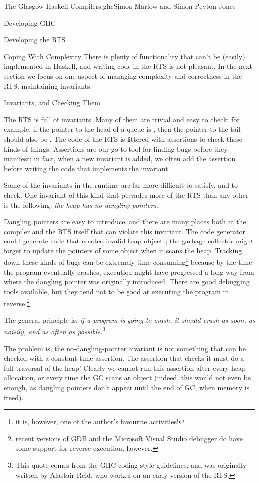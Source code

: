 \begin{aosachapter}{The Glasgow Haskell Compiler}{s:ghc}{Simon Marlow and Simon Peyton-Jones}
\begin{aosasect1}{Developing GHC}
\begin{aosasect2}{Developing the RTS}
\begin{aosasect3}{Coping With Complexity}
There is plenty of functionality that can't be (easily) implemented in
Haskell, and writing code in the RTS is not pleasant.  In the next
section we focus on one aspect of managing complexity and correctness
in the RTS: maintaining invariants.

\end{aosasect3}

\end{aosasect2}

\begin{aosasect2}{Invariants, and Checking Them}

The RTS is full of invariants.  Many of them are trivial and easy to
check: for example, if the pointer to the head of a queue is
, then the pointer to the tail should also be .
The code of the RTS is littered with assertions to check these kinds
of things.  Assertions are our go-to tool for finding bugs before they
manifest; in fact, when a new invariant is added, we often add the
assertion before writing the code that implements the invariant.

Some of the invariants in the runtime are far more difficult to
satisfy, and to check.  One invariant of this kind that pervades more
of the RTS than any other is the following: \emph{the heap has no
  dangling pointers}.

Dangling pointers are easy to introduce, and there are many places
both in the compiler and the RTS itself that can violate this
invariant.  The code generator could generate code that creates
invalid heap objects; the garbage collector might forget to update the
pointers of some object when it scans the heap.  Tracking down these
kinds of bugs can be extremely time consuming\footnote{it is, however,
  one of the author's favourite activities!} because by the time the
program eventually crashes, execution might have progressed a long way
from where the dangling pointer was originally introduced.  There are
good debugging tools available, but they tend not to be good at
executing the program in reverse.\footnote{recent versions of GDB and
  the Microsoft Visual Studio debugger do have some support for
  reverse execution, however.}

The general principle is: \emph{if a program is going to crash, it
  should crash as soon, as noisily, and as often as
  possible.}\footnote{This quote comes from the GHC coding style
  guidelines, and was originally written by Alastair Reid, who worked
  on an early version of the RTS.}

The problem is, the no-dangling-pointer invariant is not something
that can be checked with a constant-time assertion.  The assertion
that checks it must do a full traversal of the heap!  Clearly we
cannot run this assertion after every heap allocation, or every time
the GC scans an object (indeed, this would not even be enough, as
dangling pointers don't appear until the end of GC, when memory is
freed).


\end{aosasect2}
\end{aosasect1}
\end{aosachapter}

